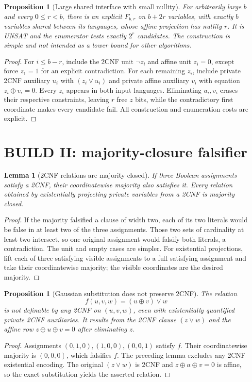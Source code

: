 \documentclass[11pt]{article}
\newtheorem{lemma}[theorem]{Lemma}
\newtheorem{proposition}[theorem]{Proposition}
\begin{document}
\begin{proposition}[Large shared interface with small nullity]
For arbitrarily large $b$ and every $0\le r<b$, there is an explicit $F_{b,r}$ on $b+2r$ variables, with exactly $b$ variables shared between its languages, whose affine projection has nullity $r$. It is UNSAT and the enumerator tests exactly $2^r$ candidates. The construction is simple and not intended as a lower bound for other algorithms.
\end{proposition}
\begin{proof}
For $i\le b-r$, include the 2CNF unit $\neg z_i$ and affine unit $z_i=0$, except force $z_1=1$ for an explicit contradiction. For each remaining $z_i$, include private 2CNF auxiliary $u_i$ with $(z_i\vee u_i)$ and private affine auxiliary $v_i$ with equation $z_i\oplus v_i=0$. Every $z_i$ appears in both input languages. Eliminating $u_i,v_i$ erases their respective constraints, leaving $r$ free $z$ bits, while the contradictory first coordinate makes every candidate fail. All construction and enumeration costs are explicit.
\end{proof}

\section{BUILD II: majority-closure falsifier}
\begin{lemma}[2CNF relations are majority closed]
If three Boolean assignments satisfy a 2CNF, their coordinatewise majority also satisfies it. Every relation obtained by existentially projecting private variables from a 2CNF is majority closed.
\end{lemma}
\begin{proof}
If the majority falsified a clause of width two, each of its two literals would be false in at least two of the three assignments. Those two sets of cardinality at least two intersect, so one original assignment would falsify both literals, a contradiction. The unit and empty cases are simpler. For existential projections, lift each of three satisfying visible assignments to a full satisfying assignment and take their coordinatewise majority; the visible coordinates are the desired majority.\end{proof}

\begin{proposition}[Gaussian substitution does not preserve 2CNF]
The relation
\[
 f(u,v,w)=(u\oplus v)\lor w
\]
is not definable by any 2CNF on $(u,v,w)$, even with existentially quantified private 2CNF auxiliaries. It results from the 2CNF clause $(z\vee w)$ and the affine row $z\oplus u\oplus v=0$ after eliminating $z$.
\end{proposition}
\begin{proof}
Assignments $(0,1,0),(1,0,0),(0,0,1)$ satisfy $f$. Their coordinatewise majority is $(0,0,0)$, which falsifies $f$. The preceding lemma excludes any 2CNF existential encoding. The original $(z\vee w)$ is 2CNF and $z\oplus u\oplus v=0$ is affine, so the exact substitution yields the asserted relation.\end{proof}
\end{document}
